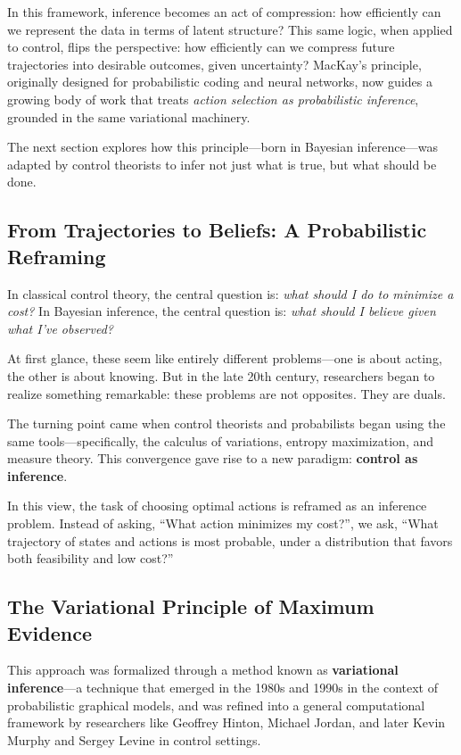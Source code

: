 In this framework, inference becomes an act of compression: how efficiently can we represent the data in terms of latent structure? This same logic, when applied to control, flips the perspective: how efficiently can we compress future trajectories into desirable outcomes, given uncertainty? MacKay’s principle, originally designed for probabilistic coding and neural networks, now guides a growing body of work that treats \emph{action selection as probabilistic inference}, grounded in the same variational machinery.

The next section explores how this principle—born in Bayesian inference—was adapted by control theorists to infer not just what is true, but what should be done.


\subsection{From Trajectories to Beliefs: A Probabilistic Reframing}

In classical control theory, the central question is: \emph{what should I do to minimize a cost?}  
In Bayesian inference, the central question is: \emph{what should I believe given what I’ve observed?}  

At first glance, these seem like entirely different problems—one is about acting, the other is about knowing. But in the late 20th century, researchers began to realize something remarkable: these problems are not opposites. They are duals.

The turning point came when control theorists and probabilists began using the same tools—specifically, the calculus of variations, entropy maximization, and measure theory. This convergence gave rise to a new paradigm: \textbf{control as inference}.

In this view, the task of choosing optimal actions is reframed as an inference problem. Instead of asking, “What action minimizes my cost?”, we ask, “What trajectory of states and actions is most probable, under a distribution that favors both feasibility and low cost?”

\subsection{The Variational Principle of Maximum Evidence}

This approach was formalized through a method known as \textbf{variational inference}—a technique that emerged in the 1980s and 1990s in the context of probabilistic graphical models, and was refined into a general computational framework by researchers like Geoffrey Hinton, Michael Jordan, and later Kevin Murphy and Sergey Levine in control settings.

